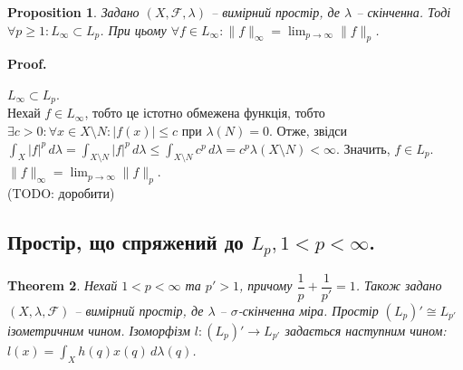 \documentclass[a4paper, 10pt]{article}
\makeatletter
\theoremstyle{theoremdd}
\newtheorem{theorem}{Theorem}[subsection]
\newtheorem{proposition}[theorem]{Proposition}
\renewenvironment{proof}[1][Proof.\\]{\par
\pushQED{\hfill \qed}%
\normalfont \topsep6\p@\@plus6\p@\relax
\trivlist
\item\relax
{\bfseries
#1\@addpunct{.}}\hspace\labelsep\ignorespaces
}{%
\popQED\endtrivlist\@endpefalse
}
\makeatother
\begin{document}
\begin{proposition}
Задано $(X,\mathcal{F},\lambda)$ -- вимірний простір, де $\lambda$ -- скінченна. Тоді $\forall p \geq 1: L_\infty \subset L_p$. При цьому $\forall f \in L_\infty: \|f\|_\infty = \displaystyle\lim_{p \to \infty} \|f\|_p$.
\end{proposition}

\begin{proof}
$L_\infty \subset L_p$.\\
Нехай $f \in L_\infty$, тобто це істотно обмежена функція, тобто $\exists c > 0: \forall x \in X \setminus N: |f(x)| \leq c$ при $\lambda(N) = 0$. Отже, звідси $\displaystyle\int_X |f|^p\,d\lambda = \int_{X \setminus N} |f|^p\,d\lambda \leq \int_{X \setminus N} c^p \,d\lambda = c^p \lambda(X \setminus N) < \infty$. Значить, $f \in L_p$.
\bigskip \\
$\|f\|_\infty = \displaystyle\lim_{p \to \infty} \|f\|_p$.\\
(TODO: доробити)
\end{proof}

\subsection{Простір, що спряжений до $L_p, 1 < p < \infty$.}
\begin{theorem}
Нехай $1 < p < \infty$ та $p' > 1$, причому $\dfrac{1}{p} + \dfrac{1}{p'} = 1$. Також задано $(X,\lambda,\mathcal{F})$ -- вимірний простір, де $\lambda$ -- $\sigma$-скінченна міра. Простір $(L_p)' \cong L_{p'}$ ізометричним чином. Ізоморфізм $l \colon (L_p)' \to L_{p'}$ задається наступним чином:\\
$l(x) = \displaystyle\int_X h(q) x(q)\,d\lambda(q)$.
\end{theorem}
\end{document}
